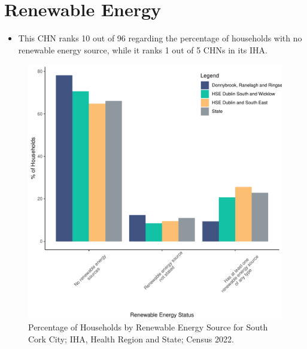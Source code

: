 \documentclass{article}
\begin{document}
\section{Renewable Energy}\label{sect:RE}
\begin{itemize}
\item This CHN ranks  10 out of 96 regarding the percentage of households with no renewable energy source, while it ranks   1 out of 5 CHNs in its IHA.
\end{itemize}
\begin{figure}[H]
	\centering
	\includegraphics[width = 140mm]{../figures/RenewableEnergyED.pdf}
	\caption{Percentage of Households by Renewable Energy Source for South Cork City; IHA, Health Region and State; Census 2022.}
	\label{fig:vbnv}
	\end{figure}
\end{document}
